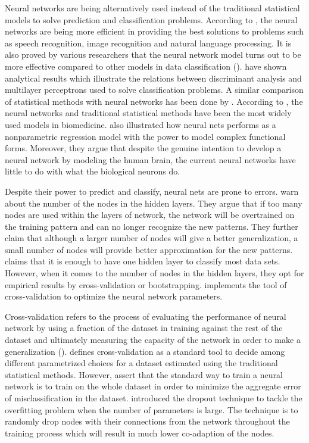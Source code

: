 Neural networks are being alternatively used instead of the traditional statistical models to solve prediction and classification problems. According to \cite{nielsen2015neural}, the neural networks are being more efficient in providing the best solutions to problems such as speech recognition, image recognition and natural language processing. It is also proved by various researchers that the neural network model turns out to be more effective compared to other models in data classification (\cite{savchenko2013real}). \cite{gallinari1991relations} have shown analytical results which illustrate the relations between discriminant analysis and multilayer perceptrons used to solve classification problems. A similar comparison of statistical methods with neural networks has been done by \cite{cheng1994neural}. According to \cite{dreiseitl2002logistic}, the neural networks and traditional statistical methods have been the most widely used models in biomedicine. \cite{warner1996understanding} also illustrated how neural nets performs as a nonparametric regression model with the power to model complex functional forms. Moreover, they argue that despite the genuine intention to develop a neural network by modeling the human brain, the current neural networks  have little to do with what the biological neurons do. 

Despite their power to predict and classify, neural nets are prone to errors. \cite{wilamowski2009neural} warn about the number of the nodes in the hidden layers. They argue that if too many nodes are used within the layers of network, the network will be overtrained on the training pattern and can no longer recognize the new patterns. They further claim that although a larger number of nodes will give a better generalization, a small number of nodes will provide better approximation for the new patterns. \cite{dreiseitl2002logistic} claims that it is enough to have one hidden layer to classify most data sets. However, when it comes to the number of nodes in the hidden layers, they opt for empirical results by cross-validation or bootstrapping. \cite{hansen1990neural} implements the tool of cross-validation to optimize the neural network parameters.

Cross-validation refers to the process of evaluating the performance of neural network by using a fraction of the dataset in training against the rest of the dataset and ultimately measuring the capacity of the network in order to make a generalization (\cite{hansen1990neural}). \cite{toussaint1974bibliography} defines cross-validation as a standard tool to decide among different parametrized choices for a dataset estimated using the traditional statistical methods. However, \cite{rumelhart1985learning} assert that the standard way to train a neural network is to train on the whole dataset in order to minimize the aggregate error of misclassification in the dataset. \cite{srivastava2014dropout} introduced the dropout technique to tackle the overfitting problem when the number of parameters is large. The technique is to randomly drop nodes with their connections from the network throughout the training process which will result in much lower co-adaption of the nodes.

